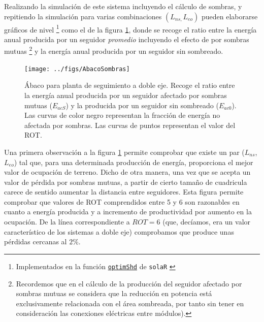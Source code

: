 Realizando la simulación de este sistema incluyendo el cálculo de
sombras, y repitiendo la simulación para varias combinaciones $(L_{ns,}L_{eo})$
pueden elaborarse gráficos de nivel%
\footnote{Implementados en la función
  \href{http://search.r-project.org/R/library/solaR/html/optimShd.html}{\texttt{optimShd}}
  de \texttt{solaR} \cite{Perpinan2012b}}%
 como el de la figura
\ref{fig:Abaco-para-planta}, donde se recoge el ratio entre
la energía anual producida por un seguidor \emph{promedio} incluyendo
el efecto de por sombras mutuas
\footnote{Recordemos
que en el cálculo de la producción del seguidor afectado por sombras
mutuas se considera que la reducción en potencia
está exclusivamente relacionada con el área sombreada, por tanto sin tener en
consideración las conexiones eléctricas entre módulos).}
y la energía anual producida por un seguidor sin sombreado. 

\begin{figure}
\begin{centering}
\texttt{[image: ../figs/AbacoSombras]}
\end{centering}

\caption[Ábaco para planta de seguimiento a doble eje.]{Ábaco para
  planta de seguimiento a doble eje\label{fig:Abaco-para-planta}. 
Recoge el ratio entre la energía anual producida por un seguidor afectado por sombras mutuas
($E_{acS}$) y la producida por un seguidor sin sombreado ($E_{ac0}$). Las curvas
de color negro representan la fracción de energía no afectada por sombras.
Las curvas de puntos representan el valor del ROT. }
\end{figure}


Una primera observación a la figura \ref{fig:Abaco-para-planta} permite
comprobar que existe un par ($L_{ns}$, $L_{eo}$) tal que, para una
determinada producción de energía, proporciona el mejor valor de ocupación
de terreno. Dicho de otra manera, una vez que se acepta un valor de
pérdida por sombras mutuas, a partir de cierto tamaño de cuadricula
carece de sentido aumentar la distancia entre seguidores. Esta figura
permite comprobar que valores de ROT comprendidos entre 5 y 6 son
razonables en cuanto a energía producida y a incremento de productividad
por aumento en la ocupación. De la línea correspondiente a $ROT=6$
(que, decíamos, era un valor característico de los sistemas a doble
eje) comprobamos que produce unas pérdidas cercanas al $2\%$. 

